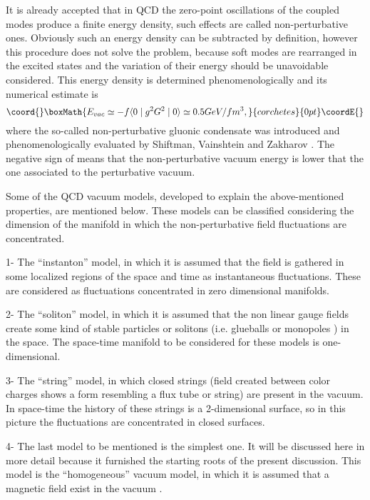 \documentclass[12pt,letterpaper]{report}
\begin{document}
It is already accepted that in QCD the zero-point oscillations of
the coupled modes produce a finite energy density, such effects
are called non-perturbative ones. Obviously such an energy density
can be subtracted by definition, however this procedure does not
solve the problem, because soft modes are rearranged in the
excited states and the variation of their energy should be
unavoidable considered. This energy density is determined
phenomenologically and its numerical estimate is \cite{Shuryak}
\[\coord{}\boxMath{
E_{vac}\simeq -f\langle 0\mid g^2G^2\mid 0\rangle \simeq
0.5GeV/fm^3,
}{corchetes}{0pt}\coordE{}\]
where the so-called non-perturbative gluonic condensate \coordHE{} was introduced and phenomenologically
evaluated by Shiftman, Vainshtein and Zakharov \cite{Zakharov}.
The negative sign of \coordHE{} means that the non-perturbative
vacuum energy is lower that the one associated to the perturbative
vacuum.

Some of the QCD vacuum models, developed to explain the
above-mentioned properties, are mentioned below. These models can
be classified considering the dimension of the manifold in which
the non-perturbative field fluctuations are concentrated.

1- The ``instanton'' model, in which it is assumed that the field
is gathered in some localized regions of the space and time as
instantaneous fluctuations. These are considered as fluctuations
concentrated in zero dimensional manifolds.

2- The ``soliton'' model, in which it is assumed that the non
linear gauge fields create some kind of stable particles or
solitons (i.e. glueballs \cite{Hansson} or monopoles
\cite{Mandelstam}) in the space. The space-time manifold to be
considered for these models is one-dimensional.

3- The ``string'' model, in which closed strings (field created
between color charges shows a form resembling a flux tube or
string) are present in the vacuum. In space-time the history of
these strings is a 2-dimensional surface, so in this picture the
fluctuations are concentrated in closed surfaces.

4- The last model to be mentioned is the simplest one. It will be
discussed here in more detail because it furnished the starting
roots of the present discussion. This model is the ``homogeneous''
vacuum model, in which it is assumed that a magnetic field exist
in the vacuum \cite{Savv1}.
\end{document}

